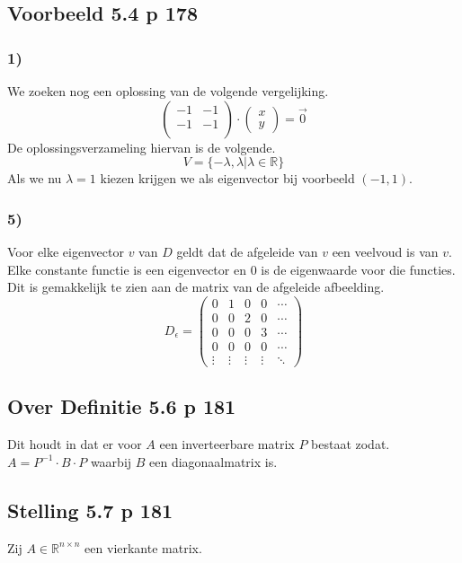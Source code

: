 \documentclass[lineaire_algebra_oplossingen.tex]{subfiles}
\begin{document}
\subsection{Voorbeeld 5.4 p 178}
\label{5.4}
\subsubsection*{1)}
We zoeken nog een oplossing van de volgende vergelijking.
\[
\begin{pmatrix}
-1 & -1\\
-1 & -1\\
\end{pmatrix}
\cdot
\begin{pmatrix}
x\\y
\end{pmatrix}
=
\vec{0}
\]
De oplossingsverzameling hiervan is de volgende.
\[
V = \{-\lambda,\lambda|\lambda\in\mathbb{R}\}
\]
Als we nu $\lambda = 1$ kiezen krijgen we als eigenvector bij voorbeeld $(-1,1)$.

\subsubsection*{5)}
Voor elke eigenvector $v$ van $D$ geldt dat de afgeleide van $v$ een veelvoud is van $v$. Elke constante functie is een eigenvector en $0$ is de eigenwaarde voor die functies. Dit is gemakkelijk te zien aan de matrix van de afgeleide afbeelding.
\[
D_{\epsilon} = 
\begin{pmatrix}
0 & 1 & 0 & 0 & \cdots\\
0 & 0 & 2 & 0 & \cdots\\
0 & 0 & 0 & 3 & \cdots\\
0 & 0 & 0 & 0 & \cdots\\
\vdots &\vdots & \vdots & \vdots & \ddots
\end{pmatrix}
\]

\subsection{Over Definitie 5.6 p 181}
\label{5.6}
Dit houdt in dat er voor $A$ een inverteerbare matrix $P$ bestaat zodat. $A = P^{-1}\cdot B\cdot P$ waarbij $B$ een diagonaalmatrix is.

\subsection{Stelling 5.7 p 181}
\label{5.7}
Zij $A \in \mathbb{R}^{n\times n}$ een vierkante matrix.
\end{document}
